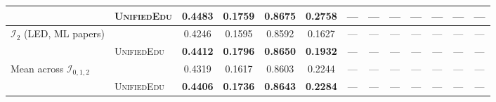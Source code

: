 \documentclass[11pt]{article}
\theoremstyle{plain}
\theoremstyle{definition}
\theoremstyle{remark}
\newcommand{\UniEdu}{\textsc{UnifiedEdu}}
\newcommand{\indiv}{\text{indiv}}
\begin{document}
\begin{table}[t]
\begin{tabular}{ll cccc ccccccc}
  & \UniEdu{}  & \textbf{0.4483} & \textbf{0.1759} & \textbf{0.8675} & \textbf{0.2758} & --- & --- & --- & --- & --- & --- & --- \\
\midrule
\multirow{2}{*}{$\mathcal{I}_2$ (LED, ML papers)}
  & \indiv     & 0.4246 & 0.1595 & 0.8592 & 0.1627 & --- & --- & --- & --- & --- & --- & --- \\
  & \UniEdu{}  & \textbf{0.4412} & \textbf{0.1796} & \textbf{0.8650} & \textbf{0.1932} & --- & --- & --- & --- & --- & --- & --- \\
\midrule
\multirow{2}{*}{Mean across $\mathcal{I}_{0,1,2}$}
  & \indiv     & 0.4319 & 0.1617 & 0.8603 & 0.2244 & --- & --- & --- & --- & --- & --- & --- \\
  & \UniEdu{}  & \textbf{0.4406} & \textbf{0.1736} & \textbf{0.8643} & \textbf{0.2284} & --- & --- & --- & --- & --- & --- & --- \\
\bottomrule
\end{tabular}
\end{table}
\end{document}
